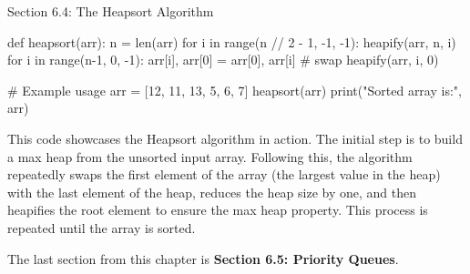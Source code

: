 \begin{notes}{Section 6.4: The Heapsort Algorithm}
\begin{highlight}
\begin{code}[Python]
    def heapsort(arr):
        n = len(arr)
        for i in range(n // 2 - 1, -1, -1):
            heapify(arr, n, i)
        for i in range(n-1, 0, -1):
            arr[i], arr[0] = arr[0], arr[i]  # swap
            heapify(arr, i, 0)
    
    # Example usage
    arr = [12, 11, 13, 5, 6, 7]
    heapsort(arr)
    print("Sorted array is:", arr)
    \end{code}
        
        This code showcases the Heapsort algorithm in action. The initial step is to build a max heap from the unsorted input array. Following this, the algorithm repeatedly swaps the first element of 
        the array (the largest value in the heap) with the last element of the heap, reduces the heap size by one, and then heapifies the root element to ensure the max heap property. This process is 
        repeated until the array is sorted.
    \end{highlight}
\end{notes}

The last section from this chapter is \textbf{Section 6.5: Priority Queues}.


